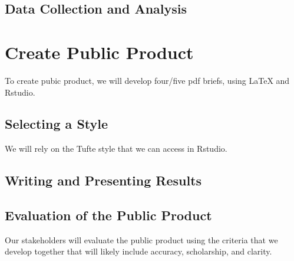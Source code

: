 \documentclass{article}\usepackage[]{graphicx}\usepackage[]{color}
\begin{document}
\subsection{Data Collection and Analysis}

\section{Create Public Product}

To create pubic product, we will develop four/five pdf briefs, using LaTeX and Rstudio. 

\subsection{Selecting a Style}

We will rely on the Tufte style that we can access in Rstudio. 

\subsection{Writing and Presenting Results}

\subsection{Evaluation of the Public Product}

Our stakeholders will evaluate the public product using the criteria that we develop together that will likely include accuracy, scholarship, and clarity. 
\end{document}
